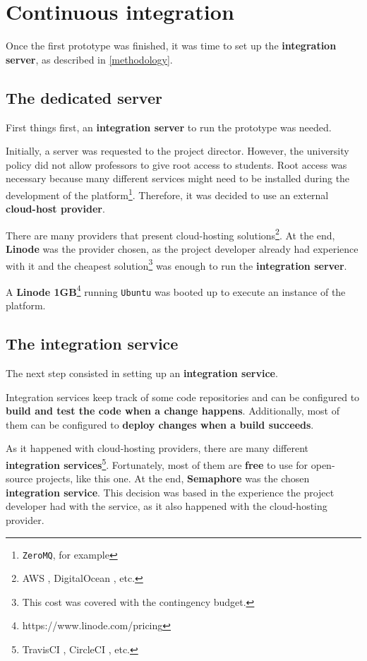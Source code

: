 \documentclass[a4paper,11pt,titlepage,abstract,numbers=noenddot,automark,mnsy,intlimits,rgb,dvipsnames]{report}
\begin{document}
\chapter{Continuous integration}
Once the first prototype was finished, it was time to set up the \textbf{integration server}, as described in
\autoref{methodology}.
\section{The dedicated server}
First things first, an \textbf{integration server} to run the prototype was needed.

Initially, a server was requested to the project director. However, the university policy did not allow professors
to give root access to students. Root access was necessary because many different services might need to be installed during the
development of the platform\footnote{\texttt{ZeroMQ}, for example}. Therefore, it was decided to use an external \textbf{cloud-host provider}.

There are many providers that present cloud-hosting solutions\footnote{AWS \cite{aws}, DigitalOcean \cite{digital_ocean}, etc.}.
At the end, \textbf{Linode} \cite{linode} was the provider chosen, as the project developer already had experience with it and
the cheapest solution\footnote{This cost was covered with the contingency budget.} was enough to run the \textbf{integration server}.

A \textbf{Linode 1GB}\footnote{https://www.linode.com/pricing} running \texttt{Ubuntu} was booted up to execute an
instance of the platform.
\section{The integration service}
The next step consisted in setting up an \textbf{integration service}.

Integration services keep track of some code repositories and can be configured to \textbf{build and test the code when a change 
happens}. Additionally, most of them can be configured to \textbf{deploy changes when a build succeeds}.

As it happened with cloud-hosting providers, there are many different \textbf{integration
services}\footnote{TravisCI \cite{travis}, CircleCI \cite{circle}, etc.}. Fortunately, most of them
are \textbf{free} to use for open-source projects, like this one. At the end, \textbf{Semaphore} \cite{semaphoreci} was the chosen
\textbf{integration service}. This decision was based in the experience the project developer had with the service, as it
also happened with the cloud-hosting provider.
\end{document}
